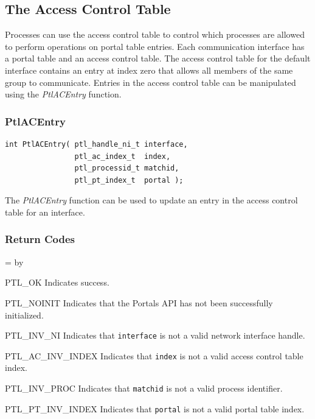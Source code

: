 \documentclass{sand-report}
\newcommand{\retlabel}[1]{\mbox{\texttt{#1}}\hfil}
\newenvironment{returns}%
  {\begin{list}{}%
      {\renewcommand{\makelabel}{\retlabel}%
        \topsep=0.0pt%
        \labelwidth=1.25in%
        \leftmargin=\labelwidth%
        \advance \leftmargin by \labelsep%
        \setlength{\itemsep}{.5\smallskipamount}%
        \setlength{\parsep}{0pt}}%
      }%
  {\end{list}}
\begin{document}
\subsection{The Access Control Table}\label{sec:ac}

Processes can use the access control table to control which processes
are allowed to perform operations on portal table entries.  Each
communication interface has a portal table and an access control
table.  The access control table for the default interface contains an
entry at index zero that allows all members of the same group to
communicate.  Entries in the access control table can be manipulated
using the \emph{PtlACEntry} function.

\subsubsection{PtlACEntry}\label{sec:acentry}
\begin{verbatim}
int PtlACEntry( ptl_handle_ni_t interface,
                ptl_ac_index_t  index,
                ptl_processid_t matchid,
                ptl_pt_index_t  portal );
\end{verbatim}

\noindent
The \emph{PtlACEntry} function can be used to update an entry in the
access control table for an interface.

\subsubsection*{Return Codes}
\begin{returns}
\item[PTL_OK] Indicates success.
\item[PTL_NOINIT] Indicates that the Portals API has not been
  successfully initialized.
\item[PTL_INV_NI] Indicates that \texttt{interface} is not a valid
  network interface handle.
\item[PTL_AC_INV_INDEX] Indicates that \texttt{index} is not a valid
  access control table index.
\item[PTL_INV_PROC] Indicates that \texttt{matchid} is not a valid
  process identifier.
\item[PTL_PT_INV_INDEX] Indicates that \texttt{portal} is not a valid
  portal table index.
\end{returns}
\end{document}
